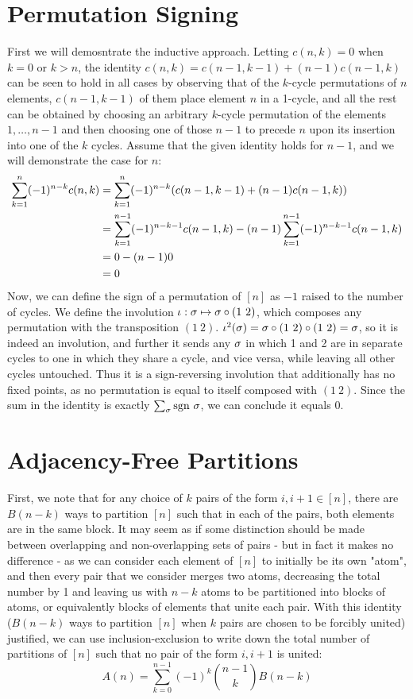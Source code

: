 \documentclass{article}
\begin{document}
\section{Permutation Signing}

First we will demosntrate the inductive approach. Letting $c(n, k) = 0$ when $k = 0$ or $k > n$, the identity $c(n, k) = c(n-1, k-1) + (n-1)c(n-1, k)$ can be seen to hold in all cases by observing that of the $k$-cycle permutations of $n$ elements, $c(n-1, k-1)$ of them place element $n$ in a 1-cycle, and all the rest can be obtained by choosing an arbitrary $k$-cycle permutation of the elements $1, \ldots, n-1$ and then choosing one of those $n-1$ to precede $n$ upon its insertion into one of the $k$ cycles. Assume that the given identity holds for $n-1$, and we will demonstrate the case for $n$:
\begin{align*}
\sum_{k=1}^n(-1)^{n-k}c(n, k) &= \sum_{k=1}^n(-1)^{n-k}\qty(c(n-1, k-1) + (n-1)c(n-1, k)) \\
&= \sum_{k=1}^{n-1}(-1)^{n-k-1}c(n-1, k) - (n-1)\sum_{k=1}^{n-1}(-1)^{n-k-1}c(n-1, k) \\
&= 0 - (n-1)0\\ 
&= 0
\end{align*}
Now, we can define the sign of a permutation of $[n]$ as $-1$ raised to the number of cycles. We define the involution $\iota: \sigma \mapsto \sigma\circ(1~2)$, which composes any permutation with the transposition $(1~2)$. $\iota^2(\sigma) = \sigma\circ(1~2)\circ(1~2) = \sigma$, so it is indeed an involution, and further it sends any $\sigma$ in which 1 and 2 are in separate cycles to one in which they share a cycle, and vice versa, while leaving all other cycles untouched. Thus it is a sign-reversing involution that additionally has no fixed points, as no permutation is equal to itself composed with $(1~2)$. Since the sum in the identity is exactly $\sum_\sigma \text{sgn}~\sigma$, we can conclude it equals 0.

\section{Adjacency-Free Partitions}

First, we note that for any choice of $k$ pairs of the form $i, i+1 \in [n]$, there are $B(n-k)$ ways to partition $[n]$ such that in each of the pairs, both elements are in the same block. It may seem as if some distinction should be made between overlapping and non-overlapping sets of pairs - but in fact it makes no difference - as we can consider each element of $[n]$ to initially be its own "atom", and then every pair that we consider merges two atoms, decreasing the total number by 1 and leaving us with $n-k$ atoms to be partitioned into blocks of atoms, or equivalently blocks of elements that unite each pair. With this identity ($B(n-k)$ ways to partition $[n]$ when $k$ pairs are chosen to be forcibly united) justified, we can use inclusion-exclusion to write down the total number of partitions of $[n]$ such that no pair of the form $i, i+1$ is united:
$$A(n) = \sum_{k = 0}^{n-1}(-1)^k\binom{n-1}{k}B(n-k)$$
\end{document}
